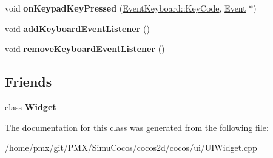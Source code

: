 \begin{DoxyCompactItemize}
void {\bfseries on\+Keypad\+Key\+Pressed} (\hyperlink{classEventKeyboard_a7cd3fa46515673276ce8ec7f0e051606}{Event\+Keyboard\+::\+Key\+Code}, \hyperlink{classEvent}{Event} $\ast$)
\item 
\mbox{\label{classui_1_1Widget_1_1FocusNavigationController_ae28e517cba30738905d09a629245dc6d}} 
void {\bfseries add\+Keyboard\+Event\+Listener} ()
\item 
\mbox{\label{classui_1_1Widget_1_1FocusNavigationController_ae9bcce4e64aec757c529fddc302dcb02}} 
void {\bfseries remove\+Keyboard\+Event\+Listener} ()
\end{DoxyCompactItemize}
\subsection*{Friends}
\begin{DoxyCompactItemize}
\item 
\mbox{\label{classui_1_1Widget_1_1FocusNavigationController_afc4c2169b499b3ea4e8c3e0924a3df4f}} 
class {\bfseries Widget}
\end{DoxyCompactItemize}


The documentation for this class was generated from the following file\+:\begin{DoxyCompactItemize}
\item 
/home/pmx/git/\+P\+M\+X/\+Simu\+Cocos/cocos2d/cocos/ui/U\+I\+Widget.\+cpp\end{DoxyCompactItemize}
